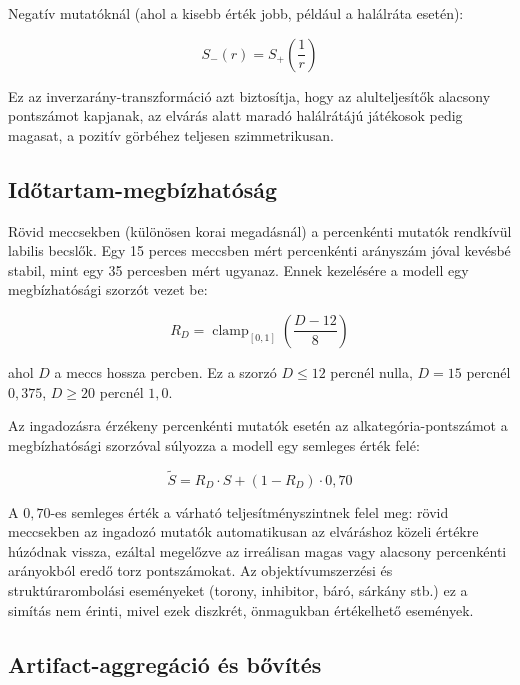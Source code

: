 Negatív mutatóknál (ahol a kisebb érték jobb, például a halálráta esetén):

\begin{equation}
S_-(r) = S_+\!\left(\frac{1}{r}\right)
\end{equation}

Ez az inverzarány-transzformáció azt biztosítja, hogy az alulteljesítők alacsony pontszámot kapjanak, az elvárás alatt maradó halálrátájú játékosok pedig magasat, a pozitív görbéhez teljesen szimmetrikusan.

\subsection{Időtartam-megbízhatóság}

Rövid meccsekben (különösen korai megadásnál) a percenkénti mutatók rendkívül labilis becslők. Egy 15 perces meccsben mért percenkénti arányszám jóval kevésbé stabil, mint egy 35 percesben mért ugyanaz. Ennek kezelésére a modell egy megbízhatósági szorzót vezet be:

\begin{equation}
R_D = \operatorname{clamp}_{[0,1]}\!\left(\frac{D - 12}{8}\right)
\end{equation}

ahol $D$ a meccs hossza percben. Ez a szorzó $D \le 12$ percnél nulla, $D = 15$ percnél $0{,}375$, $D \ge 20$ percnél $1{,}0$.

Az ingadozásra érzékeny percenkénti mutatók esetén az alkategória-pontszámot a megbízhatósági szorzóval súlyozza a modell egy semleges érték felé:

\begin{equation}
\tilde{S} = R_D \cdot S + (1 - R_D) \cdot 0{,}70
\end{equation}

A $0{,}70$-es semleges érték a várható teljesítményszintnek felel meg: rövid meccsekben az ingadozó mutatók automatikusan az elváráshoz közeli értékre húzódnak vissza, ezáltal megelőzve az irreálisan magas vagy alacsony percenkénti arányokból eredő torz pontszámokat. Az objektívumszerzési és struktúrarombolási eseményeket (torony, inhibitor, báró, sárkány stb.) ez a simítás nem érinti, mivel ezek diszkrét, önmagukban értékelhető események.

\subsection{Artifact-aggregáció és bővítés}

